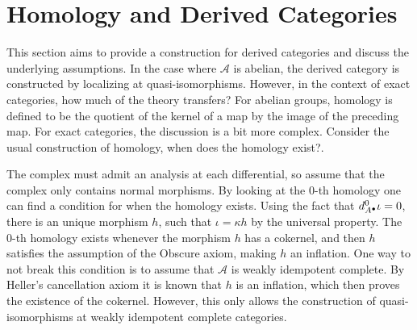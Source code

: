 \section{Homology and Derived Categories}

    This section aims to provide a construction for derived categories and discuss the underlying assumptions. In the case where $\mathcal{A}$ is abelian, the derived category is constructed by localizing at quasi-isomorphisms. However, in the context of exact categories, how much of the theory transfers? For abelian groups, homology is defined to be the quotient of the kernel of a map by the image of the preceding map. For exact categories, the discussion is a bit more complex. Consider the usual construction of homology, when does the homology exist?.

    \begin{center}
    \end{center}

    The complex must admit an analysis at each differential, so assume that the complex only contains normal morphisms. By looking at the 0-th homology one can find a condition for when the homology exists. Using the fact that $d^0_{A^{\bullet}}\iota = 0$, there is an unique morphism $h$, such that $\iota = \kappa h$ by the universal property. The 0-th homology exists whenever the morphism $h$ has a cokernel, and then $h$ satisfies the assumption of the Obscure axiom, making $h$ an inflation. One way to not break this condition is to assume that $\mathcal{A}$ is weakly idempotent complete. By Heller's cancellation axiom it is known that $h$ is an inflation, which then proves the existence of the cokernel. However, this only allows the construction of quasi-isomorphisms at weakly idempotent complete categories. \\
    
